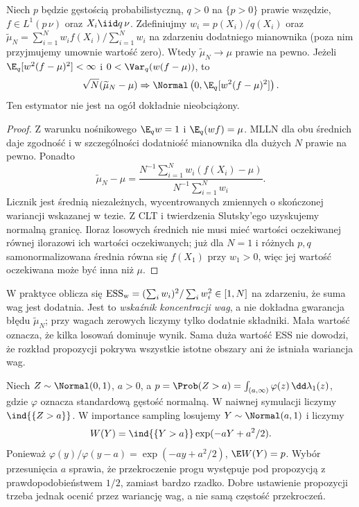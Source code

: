 \begin{twierdzenie}
\label{thm:sn-is}
Niech $p$ będzie gęstością probabilistyczną,
$q>0$ na $\{p>0\}$ prawie wszędzie,
$f\in L^1(p\,\nu)$ oraz $X_i\iid q\,\nu$.
Zdefiniujmy $w_i=p(X_i)/q(X_i)$ oraz
$\widetilde\mu_N=\sum_{i=1}^Nw_i f(X_i)/\sum_{i=1}^Nw_i$
na zdarzeniu dodatniego mianownika (poza nim przyjmujemy
umownie wartość zero). Wtedy
$\widetilde\mu_N\to\mu$ prawie na pewno.
Jeżeli $\E_q[w^2(f-\mu)^2]<\infty$ i
$0<\Var_q(w(f-\mu))$, to
\[
 \sqrt N(\widetilde\mu_N-\mu)
 \Rightarrow\Normal\left(0,\E_q[w^2(f-\mu)^2]\right).
\]
Ten estymator nie jest na ogół dokładnie nieobciążony.
\end{twierdzenie}
\begin{proof}
Z warunku nośnikowego $\E_q w=1$ i
$\E_q(wf)=\mu$. MLLN dla obu średnich daje zgodność i
w szczególności dodatniość mianownika dla dużych $N$
prawie na pewno. Ponadto
\[
 \widetilde\mu_N-\mu=
 \frac{N^{-1}\sum_{i=1}^N w_i(f(X_i)-\mu)}
      {N^{-1}\sum_{i=1}^N w_i}.
\]
Licznik jest średnią niezależnych, wycentrowanych
zmiennych o skończonej wariancji wskazanej w tezie.
Z CLT i twierdzenia Slutsky'ego uzyskujemy normalną granicę.
Iloraz losowych średnich nie musi mieć wartości oczekiwanej
równej ilorazowi ich wartości oczekiwanych; już dla $N=1$
i różnych $p,q$ samonormalizowana średnia równa się
$f(X_1)$ przy $w_1>0$, więc jej wartość oczekiwana
może być inna niż $\mu$.
\end{proof}

\begin{uwaga}
W praktyce oblicza się
$\mathrm{ESS}_{\rm w}=(\sum_iw_i)^2/\sum_iw_i^2\in[1,N]$
na zdarzeniu, że suma wag jest dodatnia.
Jest to \emph{wskaźnik koncentracji wag}, a nie dokładna
gwarancja błędu $\widetilde\mu_N$; przy wagach zerowych
liczymy tylko dodatnie składniki. Mała wartość oznacza,
że kilka losowań dominuje wynik. Sama duża wartość ESS
nie dowodzi, że rozkład propozycji pokrywa wszystkie
istotne obszary ani że istniała wariancja wag.
\end{uwaga}

\begin{przyklad}
Niech $Z\sim\Normal(0,1)$, $a>0$, a
$p=\Prob(Z>a)=\int_{(a,\infty)}\varphi(z)\,\dd\lambda_1(z)$,
gdzie $\varphi$ oznacza standardową gęstość normalną.
W naiwnej symulacji liczymy $\ind{\{Z>a\}}$.
W importance sampling losujemy $Y\sim\Normal(a,1)$ i liczymy
\[
 W(Y)=\ind{\{Y>a\}}\exp(-aY+a^2/2).
\]
Ponieważ $\varphi(y)/\varphi(y-a)=\exp(-ay+a^2/2)$,
$\E W(Y)=p$. Wybór przesunięcia $a$ sprawia, że
przekroczenie progu występuje pod propozycją
z prawdopodobieństwem $1/2$, zamiast bardzo rzadko.
Dobre ustawienie propozycji trzeba jednak ocenić przez
wariancję wag, a nie samą częstość przekroczeń.
\end{przyklad}

